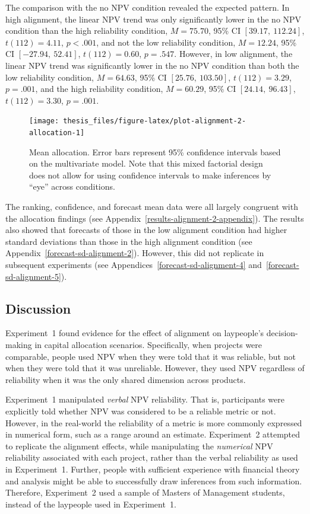 \documentclass[a4paper, nobind, dvipsnames]{templates/ociamthesis}
\theoremstyle{definition}
\theoremstyle{definition}
\theoremstyle{definition}
\theoremstyle{definition}
\theoremstyle{remark}
\begin{document}
The comparison with the no NPV condition revealed the expected pattern. In high
alignment, the linear NPV trend was only significantly lower in the no NPV
condition than the high reliability condition,
\(M = 75.70\), 95\% CI \([39.17,~112.24]\), \(t(112) = 4.11\), \(p < .001\), and not the low
reliability condition, \(M = 12.24\), 95\% CI \([-27.94,~52.41]\), \(t(112) = 0.60\), \(p = .547\).
However, in low alignment, the linear NPV trend was significantly lower in the
no NPV condition than both the low reliability condition,
\(M = 64.63\), 95\% CI \([25.76,~103.50]\), \(t(112) = 3.29\), \(p = .001\), and the high
reliability condition, \(M = 60.29\), 95\% CI \([24.14,~96.43]\), \(t(112) = 3.30\), \(p = .001\).



\begin{figure}
\texttt{[image: thesis\_files/figure-latex/plot-alignment-2-allocation-1]} \caption{Mean allocation. Error bars represent 95\% confidence intervals based on the multivariate model. Note that this mixed factorial design does not allow for using confidence intervals to make inferences by ``eye'' across conditions.}\label{fig:plot-alignment-2-allocation}
\end{figure}

The ranking, confidence, and forecast mean data were all largely congruent with
the allocation findings (see Appendix~\ref{results-alignment-2-appendix}). The
results also showed that forecasts of those in the low alignment condition had
higher standard deviations than those in the high alignment condition (see
Appendix~\ref{forecast-sd-alignment-2}). However, this did not replicate in
subsequent experiments (see Appendices~\ref{forecast-sd-alignment-4}
and~\ref{forecast-sd-alignment-5}).

\subsection{Discussion}

Experiment~1 found evidence for the effect of alignment on laypeople's
decision-making in capital allocation scenarios. Specifically, when projects
were comparable, people used NPV when they were told that it was reliable, but
not when they were told that it was unreliable. However, they used NPV
regardless of reliability when it was the only shared dimension across products.

Experiment~1 manipulated \emph{verbal} NPV reliability. That is, participants were
explicitly told whether NPV was considered to be a reliable metric or not.
However, in the real-world the reliability of a metric is more commonly
expressed in numerical form, such as a range around an estimate. Experiment~2
attempted to replicate the alignment effects, while manipulating the \emph{numerical}
NPV reliability associated with each project, rather than the verbal reliability
as used in Experiment~1. Further, people with sufficient experience with
financial theory and analysis might be able to successfully draw inferences from
such information. Therefore, Experiment~2 used a sample of Masters of Management
students, instead of the laypeople used in Experiment~1.
\end{document}
